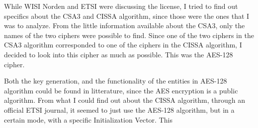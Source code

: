 While WISI Norden and ETSI were discussing the license, I tried to find 
out specifics about the CSA3 and CISSA algorithm, since those were the 
ones that I was to analyze. From the little information available about 
the CSA3, only the names of the two ciphers were possible to find. 
Since one of the two ciphers in the CSA3 algorithm corresponded to one 
of the ciphers in the CISSA algorithm, I decided to look into this 
cipher as much as possible. This was the AES-128 cipher.

Both the key generation, and the functionality of the entities in 
AES-128 algorithm could be found in litterature, since the AES 
encryption is a public algorithm. From what I could find out about 
the CISSA algorithm, through an official ETSI journal, it seemed to 
just use the AES-128 algorithm, but in a certain mode, with a specific 
Initialization Vector. This 
